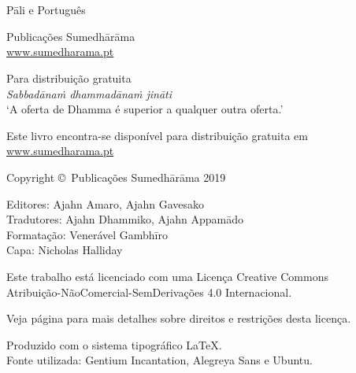 
\thispagestyle{empty}

\enlargethispage{\baselineskip}

{\centering\small
\setlength{\parskip}{15pt}

{\normalsize
\thetitle\\
\thesubtitle\\
Pāli e Português}

Publicações Sumedhārāma\\
\href{http://sumedharama.pt}{www.sumedharama.pt}

Para distribuição gratuita\\
\textit{Sabbadānaṁ dhammadānaṁ jināti}\\
‘A oferta de Dhamma é superior a qualquer outra oferta.’

Este livro encontra-se disponível para distribuição gratuita em\\
\href{http://sumedharama.pt}{www.sumedharama.pt}


Copyright \copyright\ Publicações Sumedhārāma 2019

Editores: Ajahn Amaro, Ajahn Gavesako\\
Tradutores: Ajahn Dhammiko, Ajahn Appamādo\\
Formatação: Venerável Gambhīro\\
Capa: Nicholas Halliday

\vfill

Este trabalho está licenciado com uma Licença Creative Commons\\
Atribuição-NãoComercial-SemDerivações 4.0 Internacional.

Veja página \pageref{copyright-details} para mais detalhes sobre direitos e restrições desta licença.

Produzido com o sistema tipográfico \LaTeX.\\
Fonte utilizada: Gentium Incantation, Alegreya Sans e Ubuntu.

\theEditionInfo

}
